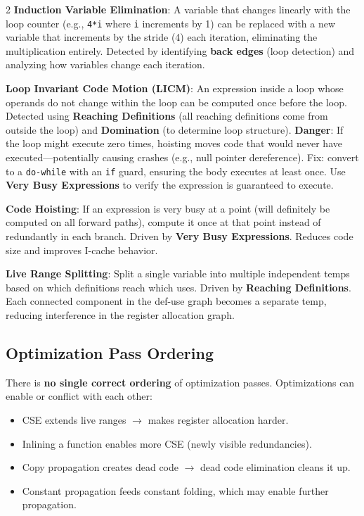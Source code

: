 \documentclass[9pt,landscape]{extarticle}
\begin{document}
\begin{multicols}{2}
\textbf{Induction Variable Elimination}: A variable that changes linearly with the loop counter (e.g., \texttt{4*i} where \texttt{i} increments by 1) can be replaced with a new variable that increments by the stride (4) each iteration, eliminating the multiplication entirely. Detected by identifying \textbf{back edges} (loop detection) and analyzing how variables change each iteration.

\textbf{Loop Invariant Code Motion (LICM)}: An expression inside a loop whose operands do not change within the loop can be computed once before the loop. Detected using \textbf{Reaching Definitions} (all reaching definitions come from outside the loop) and \textbf{Domination} (to determine loop structure). \textbf{Danger}: If the loop might execute zero times, hoisting moves code that would never have executed---potentially causing crashes (e.g., null pointer dereference). Fix: convert to a \texttt{do-while} with an \texttt{if} guard, ensuring the body executes at least once. Use \textbf{Very Busy Expressions} to verify the expression is guaranteed to execute.

\textbf{Code Hoisting}: If an expression is very busy at a point (will definitely be computed on all forward paths), compute it once at that point instead of redundantly in each branch. Driven by \textbf{Very Busy Expressions}. Reduces code size and improves I-cache behavior.

\textbf{Live Range Splitting}: Split a single variable into multiple independent temps based on which definitions reach which uses. Driven by \textbf{Reaching Definitions}. Each connected component in the def-use graph becomes a separate temp, reducing interference in the register allocation graph.

\subsection{Optimization Pass Ordering}

There is \textbf{no single correct ordering} of optimization passes. Optimizations can enable or conflict with each other:
\begin{itemize}
  \item CSE extends live ranges $\to$ makes register allocation harder.
  \item Inlining a function enables more CSE (newly visible redundancies).
  \item Copy propagation creates dead code $\to$ dead code elimination cleans it up.
  \item Constant propagation feeds constant folding, which may enable further propagation.
\end{itemize}


\end{multicols}
\end{document}
